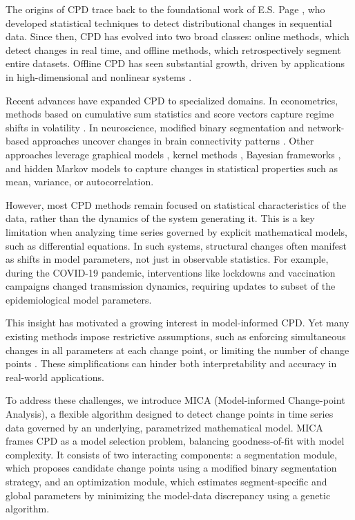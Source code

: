 \documentclass[10pt,letterpaper]{article}
\begin{document}
The origins of CPD trace back to the foundational work of E.S. Page \cite{page1954continuous,page1955test}, who developed statistical techniques to detect distributional changes in sequential data. Since then, CPD has evolved into two broad classes: online methods, which detect changes in real time, and offline methods, which retrospectively segment entire datasets. Offline CPD has seen substantial growth, driven by applications in high-dimensional and nonlinear systems \cite{truong2020selective}.

Recent advances have expanded CPD to specialized domains. In econometrics, methods based on cumulative sum statistics and score vectors capture regime shifts in volatility \cite{lee2024sequential}.  In neuroscience, modified binary segmentation and network-based approaches uncover changes in brain connectivity patterns \cite{ondrus2024fabisearch, OriginBinSeg}. Other approaches leverage graphical models \cite{gong2023latent}, kernel methods \cite{cui2023state}, Bayesian frameworks \cite{shishavan2024unsupervised}, and hidden Markov models \cite{janczura2023machine} to capture changes in statistical properties such as mean, variance, or autocorrelation.

However, most CPD methods remain focused on statistical characteristics of the data, rather than the dynamics of the system generating it. This is a key limitation when analyzing time series governed by explicit mathematical models, such as differential equations. In such systems, structural changes often manifest as shifts in model parameters, not just in observable statistics. For example, during the COVID-19 pandemic, interventions like lockdowns and vaccination campaigns changed transmission dynamics, requiring updates to subset of the epidemiological model parameters.

This insight has motivated a growing interest in model-informed CPD. Yet many existing methods impose restrictive assumptions, such as enforcing simultaneous changes in all parameters at each change point, or limiting the number of change points \cite{dass2021data, gu2022bayesian, jiang2020bayessmiles}. These simplifications can hinder both interpretability and accuracy in real-world applications.

To address these challenges, we introduce MICA (Model-informed Change-point Analysis), a flexible algorithm designed to detect change points in time series data governed by an underlying, parametrized mathematical model. MICA frames CPD as a model selection problem, balancing goodness-of-fit with model complexity. It consists of two interacting components: a segmentation module, which proposes candidate change points using a modified binary segmentation strategy, and an optimization module, which estimates segment-specific and global parameters by minimizing the model-data discrepancy using a genetic algorithm.
\end{document}
